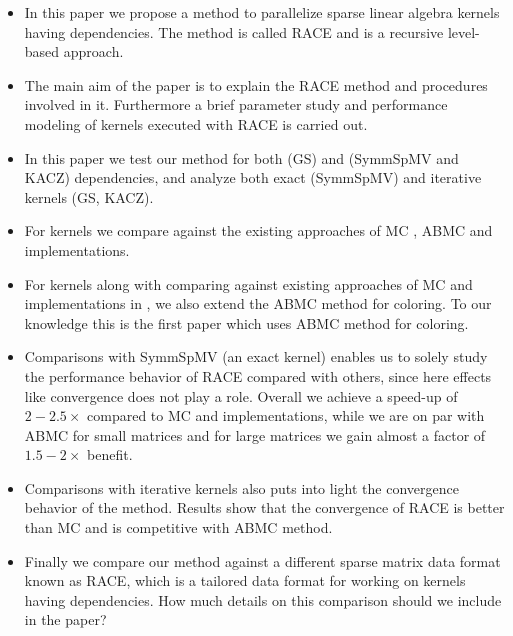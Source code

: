 \begin{itemize}
	\item In this paper we propose a method to parallelize sparse linear algebra kernels having dependencies. The method is called \acrshort{RACE} and is a recursive level-based approach.  
	
	\item The main aim of the paper is to explain the \acrshort{RACE} method and procedures involved in it. Furthermore a brief parameter study and performance modeling of kernels executed with \acrshort{RACE} is carried out.
	
	\item In this paper we test our method for both \DONE (\acrshort{GS}) and \DTWO (\acrshort{SymmSpMV} and \acrshort{KACZ}) dependencies, and analyze both exact (\acrshort{SymmSpMV}) and iterative kernels (\acrshort{GS}, \acrshort{KACZ}).
	
	\item For \DONE kernels we compare against the existing approaches of \acrshort{MC} \cite{MC}, \acrshort{ABMC} \cite{ABMC} and \MKL \cite{MKL} implementations.
	
	\item For \DTWO kernels along with comparing against existing approaches of \acrshort{MC} \cite{feast_mc} and implementations in \MKL \cite{MKL}, we also extend the \acrshort{ABMC} method for \DTWO coloring. To our knowledge this is the first paper which uses \acrshort{ABMC} method for \DTWO coloring.
	
	\item Comparisons with \acrshort{SymmSpMV} (an exact kernel) enables us to solely study the performance behavior of \acrshort{RACE} compared with others, since here effects like convergence does not play a role. Overall we achieve a speed-up of $2-2.5 \times$ compared to \acrshort{MC} and \MKL implementations, while we are on par with \acrshort{ABMC} for small matrices and for large matrices we gain almost a factor of $1.5-2 \times$ benefit. 
	
	\item Comparisons with iterative kernels also puts into light the convergence behavior of the method. Results show that the convergence of \acrshort{RACE} is better than \acrshort{MC} and is competitive with \acrshort{ABMC} method.
	
	\item Finally we compare our method against a different sparse matrix data format known as \acrshort{RACE}, which is a tailored data format for working on kernels having dependencies. How much details on this comparison should we include in the paper? 
\end{itemize}